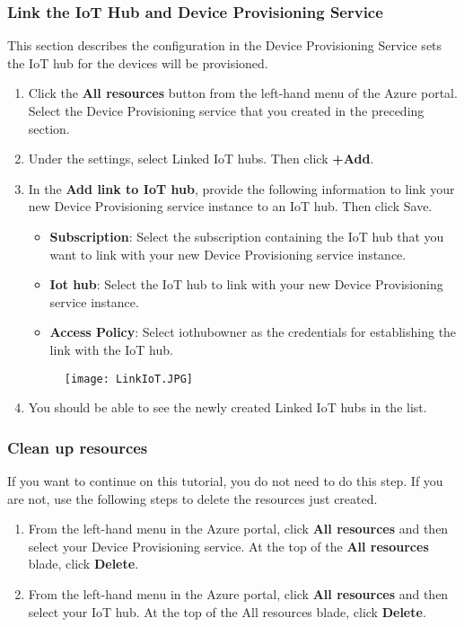 \subsubsection{Link the IoT Hub and Device Provisioning Service}
This section describes the configuration in the Device Provisioning Service sets the IoT hub for the devices will be provisioned.
\begin{enumerate}
    \item Click the \textbf{All resources} button from the left-hand menu of the Azure portal. Select the Device Provisioning service that you created in the preceding section.
    \item Under the settings, select Linked IoT hubs. Then click \textbf{+Add}. 
    \item In the \textbf{Add link to IoT hub}, provide the following information to link your new Device Provisioning service instance to an IoT hub. Then click Save.
          \begin{itemize}
              \item \textbf{Subscription}: Select the subscription containing the IoT hub that you want to link with your new Device Provisioning service instance.
              \item \textbf{Iot hub}: Select the IoT hub to link with your new Device Provisioning service instance.
              \item \textbf{Access Policy}: Select iothubowner as the credentials for establishing the link with the IoT hub.
          \end{itemize}
          \begin{figure}
            \centering
            \texttt{[image: LinkIoT.JPG]}
      \end{figure}
      \item You should be able to see the newly created Linked IoT hubs in the list.
\end{enumerate}

\subsubsection{Clean up resources}
If you want to continue on this tutorial, you do not need to do this step. If you are not, use the following steps to delete the resources just created.
\begin{enumerate}
    \item From the left-hand menu in the Azure portal, click \textbf{All resources} and then select your Device Provisioning service. At the top of the \textbf{All resources} blade, click \textbf{Delete}.
    \item From the left-hand menu in the Azure portal, click \textbf{All resources} and then select your IoT hub. At the top of the All resources blade, click \textbf{Delete}.
\end{enumerate}


